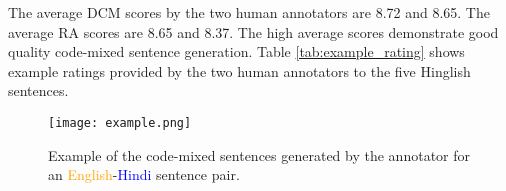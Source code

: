 \documentclass[11pt]{article}
\begin{document}
The average DCM scores by the two human annotators are 8.72 and 8.65. The average RA scores are 8.65 and 8.37. The high average scores demonstrate good quality code-mixed sentence generation. Table \ref{tab:example_rating} shows example ratings provided by the two human annotators to the five Hinglish sentences. 

\begin{figure}[!tbh]
\centering
    \texttt{[image: example.png]}
\caption{Example of the code-mixed sentences generated by the annotator for an \textcolor{orange}{English}-\textcolor{blue}{Hindi} sentence pair.}
\label{fig:example_cms}
\end{figure}

\begin{table*}[!tbh]
\small{
\centering
{}}
\caption{Example DCM and RA ratings provided by the three human annotators to the human-generated Hinglish sentences. We color code the tokens in the Hinglish sentence based on the language with the scheme: \textcolor{orange}{English} tokens with orange, \textcolor{blue}{Hindi} tokens with blue and language independent tokens with black color.}
\label{tab:example_rating}
\end{table*}
\end{document}
